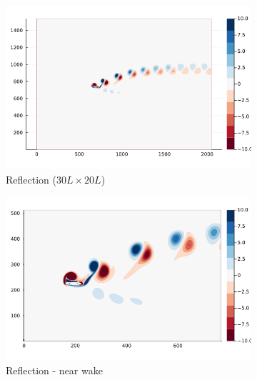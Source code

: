 \documentclass{article}
\begin{document}
\begin{figure}
    \centering
    \begin{subfigure}{.48\textwidth}
        \centering
        \includegraphics[trim={2.8cm 2cm 4cm 2cm},clip,width=\textwidth]{tex//fig/Deflected_wake_snap.png}
        \caption{Reflection ($30L\times20L$)}
    \end{subfigure}%
    \hspace{0.1cm}
    \begin{subfigure}{.48\textwidth}
        \centering
        \includegraphics[trim={2.8cm 2cm 4cm 2cm},clip,width=\textwidth]{tex/fig/Deflected_wake_snap_small.png}
        \caption{Reflection - near wake}
    \end{subfigure}
    \begin{subfigure}{.48\textwidth}
        \centering

\end{subfigure}
\end{figure}
\end{document}
